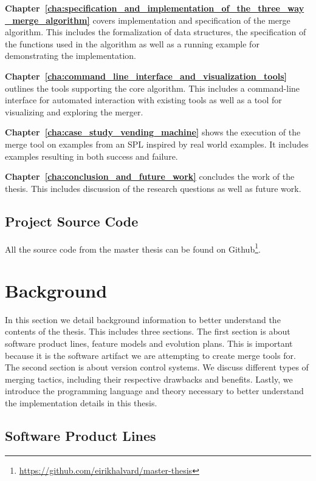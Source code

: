 \documentclass[a4paper,english]{ifimaster}
\begin{document}
\textbf{Chapter~\ref{cha:specification_and_implementation_of_the_three_way_merge_algorithm}} covers implementation and specification of the merge algorithm. This includes the formalization of data structures, the specification of the functions used in the algorithm as well as a running example for demonstrating the implementation.

\textbf{Chapter~\ref{cha:command_line_interface_and_visualization_tools}} outlines the tools supporting the core algorithm. This includes a command-line interface for automated interaction with existing tools as well as a tool for visualizing and exploring the merger.

\textbf{Chapter~\ref{cha:case_study_vending_machine}} shows the execution of the merge tool on examples from an SPL inspired by real world examples. It includes examples resulting in both success and failure.

\textbf{Chapter~\ref{cha:conclusion_and_future_work}} concludes the work of the thesis. This includes discussion of the research questions as well as future work.

\section{Project Source Code}%
\label{sec:project_source_code}

All the source code from the master thesis can be found on Github\footnote{\url{https://github.com/eirikhalvard/master-thesis}}.

\chapter{Background}%
\label{cha:background}

In this section we detail background information to better understand the contents of the thesis. This includes three sections. The first section is about software product lines, feature models and evolution plans. This is important because it is the software artifact we are attempting to create merge tools for. The second section is about version control systems. We discuss different types of merging tactics, including their respective drawbacks and benefits. Lastly, we introduce the programming language and theory necessary to better understand the implementation details in this thesis.

\section{Software Product Lines}%
\label{sec:software_product_lines}
\end{document}
